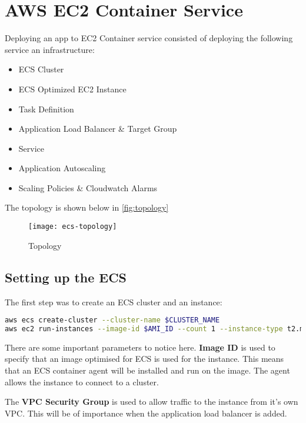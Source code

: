 \section{AWS EC2 Container Service}
Deploying an app to EC2 Container service consisted of deploying the following service an infrastructure:
\begin{itemize}
	\item ECS Cluster
	\item ECS Optimized EC2 Instance
	\item Task Definition
	\item Application Load Balancer \& Target Group
	\item Service
	\item Application Autoscaling
	\item Scaling Policies \& Cloudwatch Alarms
\end{itemize}
The topology is shown below in \autoref{fig:topology}

\begin{figure}[H]
	\setlength{\belowcaptionskip}{15pt plus 3pt minus 2pt}
	\caption{Topology}
	\centering
	\texttt{[image: ecs-topology]}
	\label{fig:topology}
\end{figure}

\subsection{Setting up the ECS}
The first step was to create an ECS cluster and an instance:
\begin{lstlisting}[language=bash]
aws ecs create-cluster --cluster-name $CLUSTER_NAME
aws ec2 run-instances --image-id $AMI_ID --count 1 --instance-type t2.micro --key-name $KEY_NAME --security-groups $HTTPSSH_SEC_GROUP $VPC_SEC_GROUP --iam-instance-profile Name=$ECS_INSTANCE_ROLE --user-data file://files/user-data.txt --tag-specifications 'ResourceType=instance,Tags=[{Key=Name,Value='$INSTANCE_NAME'}]'
\end{lstlisting}
There are some important parameters to notice here. \textbf{Image ID} is used to specify that an image optimised for ECS is used for the instance. This means that an ECS container agent will be installed and run on the image. The agent allows the instance to connect to a cluster.

The \textbf{VPC Security Group} is used to allow traffic to the instance from it's own VPC. This will be of importance when the application load balancer is added.

